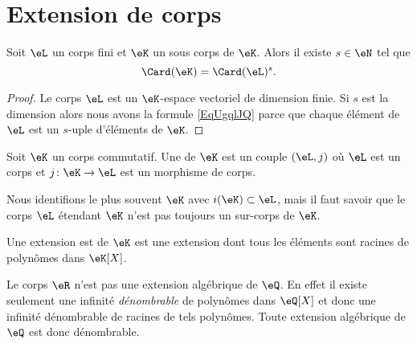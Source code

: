
\section{Extension de corps}
\label{SECooLQVJooTGeqiR}

\begin{lemma}       \label{LemobATFP}
    Soit \( \eL\) un corps fini et \( \eK\) un sous corps de \( \eK\). Alors il existe \( s\in \eN\) tel que
    \begin{equation}        \label{EqUgqlJQ}
        \Card(\eK)=\Card(\eL)^s.
    \end{equation}
\end{lemma}

\begin{proof}
    Le corps \( \eL\) est un \( \eK\)-espace vectoriel de dimension finie. Si \( s\) est la dimension alors nous avons la formule \eqref{EqUgqlJQ} parce que chaque élément de \( \eL\) est un \( s\)-uple d'éléments de \( \eK\).
\end{proof}

\begin{definition}     \label{DEFooFLJJooGJYDOe}
    Soit \( \eK\) un corps commutatif. Une  de \( \eK\) est un couple \( (\eL,j)\) où \( \eL\) est un corps et \( j\colon \eK\to \eL\) est un morphisme de corps.
\end{definition}

    Nous identifions le plus souvent \( \eK\) avec \( i(\eK)\subset \eL\), mais il faut savoir que le corps \( \eL\) étendant \( \eK\) n'est pas toujours un sur-corps de \( \eK\).
    
\begin{definition}      \label{DEFooREUHooLVwRuw}
    Une extension est  de \( \eK\) est une extension dont tous les éléments sont racines de polynômes dans \( \eK[X]\).
\end{definition}

\begin{example}
    Le corps \( \eR\) n'est pas une extension algébrique de \( \eQ\). En effet il existe seulement une infinité \emph{dénombrable} de polynômes dans \( \eQ[X]\) et donc une infinité dénombrable de racines de tels polynômes. Toute extension algébrique de \( \eQ\) est donc dénombrable.
\end{example}

